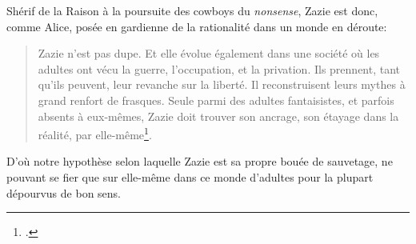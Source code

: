 Shérif de la Raison à la poursuite des cowboys du \textit{nonsense}, Zazie est donc, comme Alice, posée en gardienne de la rationalité dans un monde en déroute:
\begin{quote}
  \begin{singlespace}
    \small
    Zazie n'est pas dupe. Et elle évolue également dans une société où les adultes ont vécu la guerre, l'occupation, et la privation. Ils prennent, tant qu'ils peuvent, leur revanche sur la liberté. Il reconstruisent leurs mythes à grand renfort de frasques. Seule parmi des adultes fantaisistes, et parfois absents à eux-mêmes, Zazie doit trouver son ancrage, son étayage dans la réalité, par elle-même\footcite[89]{Maurin2007}.
    \normalsize
  \end{singlespace}
\end{quote}
D'où notre hypothèse selon laquelle Zazie est sa propre bouée de sauvetage, ne pouvant se fier que sur elle-même dans ce monde d'adultes pour la plupart dépourvus de bon sens.

